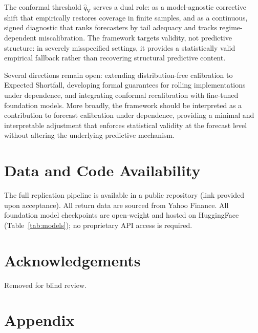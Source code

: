 \documentclass[preprint,11pt,authoryear]{elsarticle}
\newcommand{\1}{\boldsymbol{1}}
\newcommand{\qV}{\hat{q}_{\scriptscriptstyle\mathrm{V}}}
\begin{document}
	The conformal threshold $\qV$ serves a dual role: as a model-agnostic corrective shift that empirically restores coverage in finite samples, and as a continuous, signed diagnostic that ranks forecasters by tail adequacy and tracks regime-dependent miscalibration. The framework targets validity, not predictive structure: in severely misspecified settings, it provides a statistically valid empirical fallback rather than recovering structural predictive content.

	Several directions remain open: extending distribution-free calibration to Expected Shortfall, developing formal guarantees for rolling implementations under dependence, and integrating conformal recalibration with fine-tuned foundation models. More broadly, the framework should be interpreted as a contribution to forecast calibration under dependence, providing a minimal and interpretable adjustment that enforces statistical validity at the forecast level without altering the underlying predictive mechanism.

	\section*{Data and Code Availability}
	The full replication pipeline is available in a public repository (link provided upon acceptance). All return data are sourced from Yahoo Finance. All foundation model checkpoints are open-weight and hosted on HuggingFace (Table~\ref{tab:models}); no proprietary API access is required.

	\section*{Acknowledgements}
	Removed for blind review.
	
	
	
	
	
	
	
	
	\newpage
	\appendix
	\renewcommand{\thesection}{\Alph{section}}
	
	\section*{Appendix}
	
\end{document}
